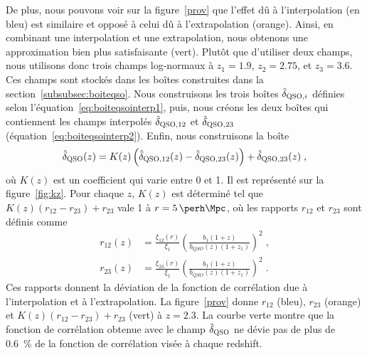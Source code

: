 \documentclass[11pt, twoside, a4paper, openright]{report}
\begin{document}
De plus, nous pouvons voir sur la figure~\ref{prov} que l'effet dû à l'interpolation (en bleu) est similaire et opposé à celui dû à l'extrapolation (orange). Ainsi, en combinant une interpolation et une extrapolation, nous obtenons une approximation bien plus satisfaisante (vert). Plutôt que d'utiliser deux champs, nous utilisons donc trois champs log-normaux à $z_1 = \num{1.9}$, $z_2 = \num{2.75}$, et $z_3 = \num{3.6}$. Ces champs sont stockés dans les boîtes construites dans la section~\ref{subsubsec:boiteqso}. Nous construisons les trois boîtes $\hat \delta_{\textsc{QSO}, i}$ définies selon l'équation~\ref{eq:boiteqsointerp1}, puis, nous créons les deux boîtes qui contiennent les champs interpolés $\hat \delta_{\textsc{QSO}, 12}$ et $\hat \delta_{\textsc{QSO}, 23}$ (équation~\ref{eq:boiteqsointerp2}). Enfin, nous construisons la boîte
\begin{equation}
  \label{eq:lognormal_interp}
 \hat \delta_{\textsc{QSO}}(z) = K(z) \left(\hat \delta_{\textsc{QSO}, 12}(z) - \hat \delta_{\textsc{QSO}, 23}(z)\right) + \hat \delta_{\textsc{QSO}, 23}(z) \; ,
\end{equation}
où $K(z)$ est un coefficient qui varie entre 0 et 1. Il est représenté sur la figure~\ref{fig:kz}. Pour chaque $z$, $K(z)$ est déterminé tel que $K(z)(r_{12} - r_{23}) + r_{23}$ vale 1 à $r = \SI{5}{\perh\Mpc}$, où les rapports $r_{12}$ et $r_{23}$ sont définis comme
\begin{align}
  r_{12}(z) &= \frac{\xi_{12}(r)}{\xi_1} \left(\frac{b_1(1+z)}{b_{QSO}(z)(1+z_1)}\right)^2 \; , \\
  r_{23}(z) &= \frac{\xi_{23}(r)}{\xi_1} \left(\frac{b_1(1+z)}{b_{QSO}(z)(1+z_1)}\right)^2 \; .
\end{align}
Ces rapports donnent la déviation de la fonction de corrélation due à l'interpolation et à l'extrapolation. La figure~\ref{prov} donne $r_{12}$ (bleu), $r_{23}$ (orange) et $K(z)(r_{12} - r_{23}) + r_{23}$ (vert) à $z=\num{2.3}$. La courbe verte montre que la fonction de corrélation obtenue avec le champ $\hat \delta_{\textsc{QSO}}$ ne dévie pas de plus de \SI{0.6}{\percent} de la fonction de corrélation visée à chaque redshift.
\end{document}
